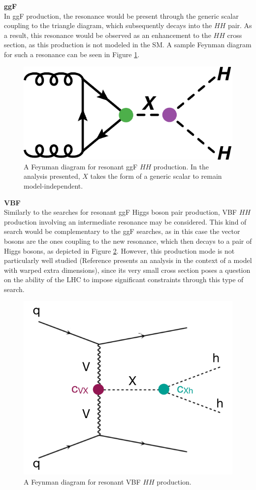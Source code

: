 \noindent\textbf{\gls{ggF}}\\
\indent In \gls{ggF} production, the resonance would be present through the generic scalar coupling to the triangle diagram, which subsequently decays into the $HH$ pair. As a result, this resonance would be observed as an enhancement to the $HH$ cross section, as this production is not modeled in the \gls{SM}. A sample Feynman diagram for such a resonance can be seen in Figure \ref{fig:ggf-resonant}.


\begin{figure}[!ht]
    \centering
    \includegraphics[width=.45\textwidth]{chapters/chapter1_theory/images/hh_res_ggf.pdf}
    \caption{A Feynman diagram for resonant ggF  $HH$ production. In the analysis presented, $X$ takes the form of a generic scalar to remain model-independent.}
    \label{fig:ggf-resonant}
\end{figure}

\noindent\textbf{VBF}\\
\indent Similarly to the searches for resonant ggF Higgs boson pair production, \gls{VBF} $HH$
production involving an intermediate resonance may be considered. This kind of search would be complementary to the ggF searches, as in this case the vector bosons are the ones coupling to the new resonance, which then decays to a pair of Higgs bosons, as depicted in Figure \ref{fig:vbf-resonant}. However, this production mode is not
particularly well studied (Reference \cite{res_vbf} presents an analysis in the context of a model with warped extra dimensions), since its very small cross section poses a question on the ability of the LHC to impose significant constraints through this type of search.

\begin{figure}[!ht]
    \centering
    \includegraphics[width=.45\textwidth]{chapters/chapter1_theory/images/vbf_resonant.png}
    \caption{A Feynman diagram for resonant VBF $HH$ production.}
    \label{fig:vbf-resonant}
\end{figure}

